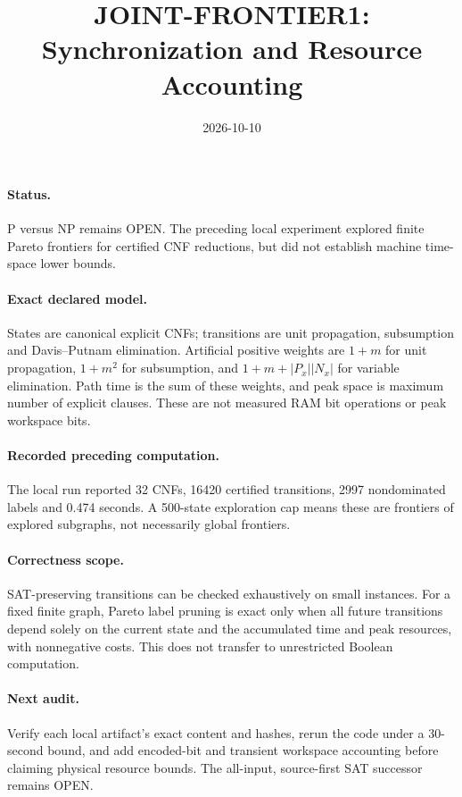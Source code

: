 \documentclass{article}
\begin{document}
\title{JOINT-FRONTIER1: Synchronization and Resource Accounting}
\date{2026-10-10}\maketitle
\paragraph{Status.} P versus NP remains OPEN. The preceding local experiment explored finite Pareto frontiers for certified CNF reductions, but did not establish machine time-space lower bounds.
\paragraph{Exact declared model.} States are canonical explicit CNFs; transitions are unit propagation, subsumption and Davis--Putnam elimination. Artificial positive weights are $1+m$ for unit propagation, $1+m^2$ for subsumption, and $1+m+|P_x||N_x|$ for variable elimination. Path time is the sum of these weights, and peak space is maximum number of explicit clauses. These are not measured RAM bit operations or peak workspace bits.
\paragraph{Recorded preceding computation.} The local run reported 32 CNFs, 16420 certified transitions, 2997 nondominated labels and 0.474 seconds. A 500-state exploration cap means these are frontiers of explored subgraphs, not necessarily global frontiers.
\paragraph{Correctness scope.} SAT-preserving transitions can be checked exhaustively on small instances. For a fixed finite graph, Pareto label pruning is exact only when all future transitions depend solely on the current state and the accumulated time and peak resources, with nonnegative costs. This does not transfer to unrestricted Boolean computation.
\paragraph{Next audit.} Verify each local artifact's exact content and hashes, rerun the code under a 30-second bound, and add encoded-bit and transient workspace accounting before claiming physical resource bounds. The all-input, source-first SAT successor remains OPEN.
\end{document}
